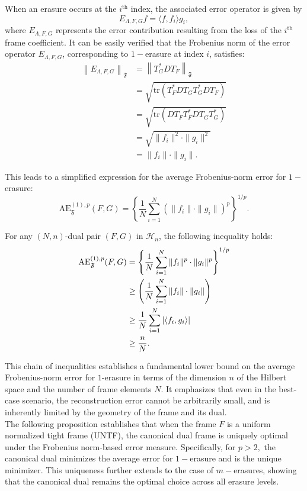 \documentclass[final,1p,times]{elsarticle}
\begin{document}
\noindent When an erasure occurs at the \( i^{\text{th}} \) index, the associated error operator is given by  
\[
E_{\Lambda,F,G} f = \langle f, f_i \rangle g_i,
\]
where \( E_{\Lambda,F,G} \) represents the error contribution resulting from the loss of the \( i^{\text{th}} \) frame coefficient. It can be easily verified that the Frobenius norm of the error operator \( E_{\Lambda,F,G} \), corresponding to $1-$erasure at index \( i \), satisfies:
\begin{align}\label{eqn2point5}
\left\|E_{\Lambda,F,G}\right\|_{\mathfrak{F}} 
&= \left\|T_{G}^* D T_{F}\right\|_{\mathfrak{F}} \nonumber\\
&= \sqrt{\mathrm{tr}\left( T_{F}^* D T_{G} T_{G}^* D T_{F} \right)} \nonumber\\
&= \sqrt{\mathrm{tr}\left( D T_{F} T_{F}^* D T_{G} T_{G}^* \right)} \nonumber\\
&= \sqrt{ \|f_i\|^2 \cdot \|g_i\|^2 } \\&= \|f_i\| \cdot \|g_i\|.
\end{align}

This leads to a simplified expression for the average Frobenius-norm error for $1-$erasure:
\[
\mathrm{AE}_{\mathfrak{F}}^{(1),p}(F, G) = \left\{ \frac{1}{N} \sum_{i=1}^N \left( \|f_i\| \cdot \|g_i\| \right)^p \right\}^{1/p}.
\]

For any $(N, n)$-dual pair $(F, G)$ in $\mathcal{H}_n$, the following inequality holds:
\begin{align}\label{eqn4.6}
\mathrm{AE}_{\mathfrak{F}}^{(1),p}(F, G)
&= \left\{ \frac{1}{N} \sum_{i=1}^N \|f_i\|^p \cdot \|g_i\|^p \right\}^{1/p} \notag \\
&\geq \left( \frac{1}{N} \sum_{i=1}^N \|f_i\| \cdot \|g_i\| \right) \notag \\
&\geq \frac{1}{N} \sum_{i=1}^N \left| \langle f_i, g_i \rangle \right| \notag \\
&\geq \frac{n}{N}.
\end{align}

This chain of inequalities establishes a fundamental lower bound on the average Frobenius-norm error for $1$-erasure in terms of the dimension $n$ of the Hilbert space and the number of frame elements $N$. It emphasizes that even in the best-case scenario, the reconstruction error cannot be arbitrarily small, and is inherently limited by the geometry of the frame and its dual. \\
The following proposition establishes that when the frame $F$ is a uniform normalized tight frame (UNTF), the canonical dual frame is uniquely optimal under the Frobenius norm-based error measure. Specifically, for $p>2,$ the canonical dual minimizes the average error for $1-$erasure and is the unique minimizer. This uniqueness further extends to the case of 
$m-$erasures, showing that the canonical dual remains the optimal choice across all erasure levels.
\end{document}
